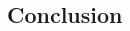 \documentclass[12pt]{spieman}  %
\begin{document}
\begin{spacing}{1}
\section{Conclusion}



\end{spacing}
\end{document}
